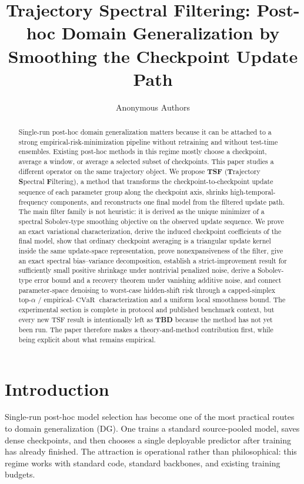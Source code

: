 \documentclass{article}
\title{Trajectory Spectral Filtering: Post-hoc Domain Generalization by Smoothing the Checkpoint Update Path}
\author{Anonymous Authors}
\newcommand{\CVaR}{\operatorname{CVaR}}
\newcommand{\tsf}{\textup{\textsc{TSF}}}
\newcommand{\TBD}{\textbf{TBD}}
\begin{document}
\maketitle

\begin{abstract}
Single-run post-hoc domain generalization matters because it can be attached to a strong empirical-risk-minimization pipeline without retraining and without test-time ensembles. Existing post-hoc methods in this regime mostly choose a checkpoint, average a window, or average a selected subset of checkpoints. This paper studies a different operator on the same trajectory object. We propose \textbf{\tsf{}} (\textbf{T}rajectory \textbf{S}pectral \textbf{F}iltering), a method that transforms the checkpoint-to-checkpoint update sequence of each parameter group along the checkpoint axis, shrinks high-temporal-frequency components, and reconstructs one final model from the filtered update path. The main filter family is not heuristic: it is derived as the unique minimizer of a spectral Sobolev-type smoothing objective on the observed update sequence. We prove an exact variational characterization, derive the induced checkpoint coefficients of the final model, show that ordinary checkpoint averaging is a triangular update kernel inside the same update-space representation, prove nonexpansiveness of the filter, give an exact spectral bias--variance decomposition, establish a strict-improvement result for sufficiently small positive shrinkage under nontrivial penalized noise, derive a Sobolev-type error bound and a recovery theorem under vanishing additive noise, and connect parameter-space denoising to worst-case hidden-shift risk through a capped-simplex top-\(\alpha\) / empirical-\(\CVaR\) characterization and a uniform local smoothness bound. The experimental section is complete in protocol and published benchmark context, but every new \tsf{} result is intentionally left as \TBD{} because the method has not yet been run. The paper therefore makes a theory-and-method contribution first, while being explicit about what remains empirical.
\end{abstract}

\section{Introduction}

Single-run post-hoc model selection has become one of the most practical routes to domain generalization (DG). One trains a standard source-pooled model, saves dense checkpoints, and then chooses a single deployable predictor after training has already finished. The attraction is operational rather than philosophical: this regime works with standard code, standard backbones, and existing training budgets.
\end{document}
